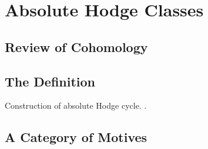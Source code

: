 \documentclass[../thesis.tex]{subfiles}
\begin{document}
\chapter{Absolute Hodge Classes} \label{chap:abs-hodge}

\section{Review of Cohomology} \label{sec:review-cohom}

\section{The Definition}
\begin{theorem}[Principle B] \label{thm:principle-b}
	
\end{theorem}
\begin{proposition} \label{prop:construct-abs-hodge}
	Construction of absolute Hodge cycle. \cite[Proposition~7.1]{deligne-hodge}.
\end{proposition}

\section{A Category of Motives}
\end{document}
